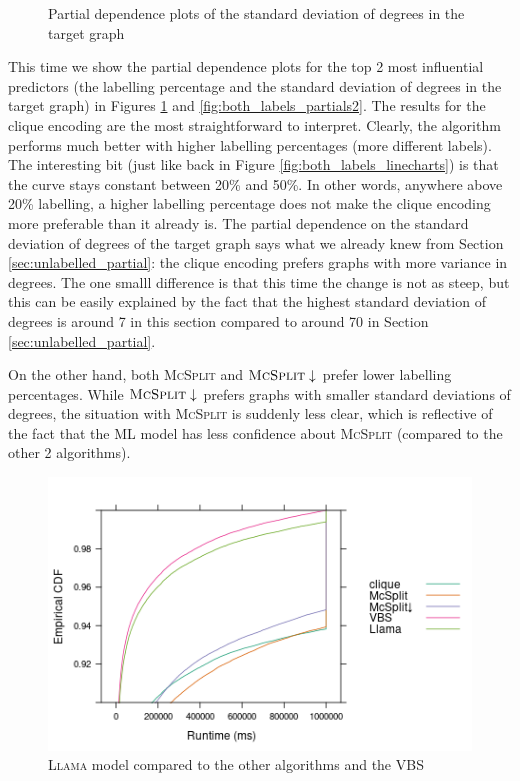 \documentclass{l4proj}
\theoremstyle{definition}
\theoremstyle{remark}
\begin{document}
\begin{figure}
\begin{subfigure}[t]{0.49\textwidth}
  \end{subfigure}
  \caption{Partial dependence plots of the standard deviation of degrees in the
    target graph}
  \label{fig:both_labels_partials1}
\end{figure}

This time we show the partial dependence plots for the top 2 most influential
predictors (the labelling percentage and the standard deviation of degrees in
the target graph) in Figures \ref{fig:both_labels_partials1} and
\ref{fig:both_labels_partials2}. The results for the clique encoding are the
most straightforward to interpret. Clearly, the algorithm performs much better
with higher labelling percentages (more different labels). The interesting bit
(just like back in Figure \ref{fig:both_labels_linecharts}) is that the curve
stays constant between 20\% and 50\%. In other words, anywhere above 20\%
labelling, a higher labelling percentage does not make the clique encoding more
preferable than it already is. The partial dependence on the standard deviation
of degrees of the target graph says what we already knew from Section
\ref{sec:unlabelled_partial}: the clique encoding prefers graphs with more
variance in degrees. The one smalll difference is that this time the change is
not as steep, but this can be easily explained by the fact that the highest
standard deviation of degrees is around 7 in this section compared to around 70
in Section \ref{sec:unlabelled_partial}.

On the other hand, both \textsc{McSplit} and $\textsc{McSplit}\downarrow$ prefer
lower labelling percentages. While $\textsc{McSplit}\downarrow$ prefers graphs
with smaller standard deviations of degrees, the situation with \textsc{McSplit}
is suddenly less clear, which is reflective of the fact that the ML model has less
confidence about \textsc{McSplit} (compared to the other 2 algorithms).

\begin{figure}
  \centering
  \includegraphics{images/ecdf_both_labels_llama.png}
  \caption{\textsc{Llama} model compared to the other algorithms and the VBS}
  \label{fig:ecdf_both_labels_llama}
\end{figure}
\end{document}
